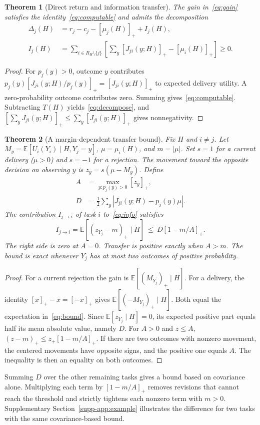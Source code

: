 \documentclass[journal]{IEEEtran}
\newcommand{\E}{\mathbb{E}}
\newcommand{\pos}[1]{[#1]_+}
\newtheorem{theorem}{Theorem}
\begin{document}
\begin{theorem}[Direct return and information transfer]\label{thm:info}
The gain in~\eqref{eq:gain} satisfies the identity~\eqref{eq:computable} and admits the decomposition
\begin{align}
 \Delta_j(H)&=r_j-c_j-\pos{\mu_j(H)}+I_j(H),\label{eq:decompose}\\
 I_j(H)&=\sum_{i\in R_H\setminus\{j\}}
 \left[\sum_y\pos{J_{ji}(y;H)}-\pos{\mu_i(H)}\right]\ge0.
 \label{eq:info}
\end{align}
\end{theorem}
\begin{proof}
For $p_j(y)>0$, outcome $y$ contributes $p_j(y)[J_{ji}(y;H)/p_j(y)]_+=[J_{ji}(y;H)]_+$ to expected delivery utility. A zero-probability outcome contributes zero. Summing gives~\eqref{eq:computable}. Subtracting $T(H)$ yields~\eqref{eq:decompose}, and $[\sum_y J_{ji}(y;H)]_+\le\sum_y[J_{ji}(y;H)]_+$ gives nonnegativity.
\end{proof}

\begin{theorem}[A margin-dependent transfer bound]\label{prop:bound}
Fix $H$ and $i\ne j$. Let $M_y=\E[U_i(Y_i)\mid H,Y_j=y]$, $\mu=\mu_i(H)$, and $m=|\mu|$. Set $s=1$ for a current delivery ($\mu>0$) and $s=-1$ for a rejection. The movement toward the opposite decision on observing $y$ is $z_y=s(\mu-M_y)$. Define
\begin{align*}
 A&=\max_{y:p_j(y)>0}[z_y]_+,\\
 D&=\tfrac12\sum_y |J_{ji}(y;H)-p_j(y)\mu|.
\end{align*}
The contribution $I_{j\to i}$ of task $i$ to~\eqref{eq:info} satisfies
\begin{equation}
 I_{j\to i}=\E[(z_{Y_j}-m)_+\mid H]
 \ \le\ D[1-m/A]_+ .\label{eq:bound}
\end{equation}
The right side is zero at $A=0$. Transfer is positive exactly when $A>m$. The bound is exact whenever $Y_j$ has at most two outcomes of positive probability.
\end{theorem}
\begin{proof}
For a current rejection the gain is $\E[(M_{Y_j})_+\mid H]$. For a delivery, the identity $[x]_+-x=[-x]_+$ gives $\E[(-M_{Y_j})_+\mid H]$. Both equal the expectation in~\eqref{eq:bound}. Since $\E[z_{Y_j}\mid H]=0$, its expected positive part equals half its mean absolute value, namely $D$. For $A>0$ and $z\le A$, $(z-m)_+\le z_+[1-m/A]_+$. If there are two outcomes with nonzero movement, the centered movements have opposite signs, and the positive one equals $A$. The inequality is then an equality on both outcomes.
\end{proof}
Summing $D$ over the other remaining tasks gives a bound based on covariance alone. Multiplying each term by $[1-m/A]_+$ removes revisions that cannot reach the threshold and strictly tightens each nonzero term with $m>0$. Supplementary Section~\ref{supp-app:example} illustrates the difference for two tasks with the same covariance-based bound.
\end{document}
